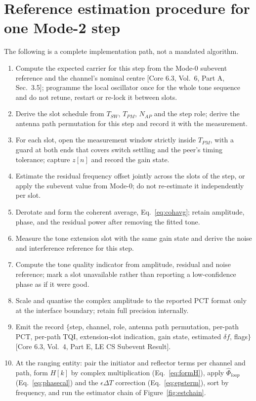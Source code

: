 \documentclass[11pt,a4paper]{article}
\newcommand{\PCT}{\mathrm{PCT}}
\newcommand{\TQI}{\mathrm{TQI}}
\newcommand{\Tsw}{T_{SW}}
\newcommand{\Tpm}{T_{PM}}
\newcommand{\Nap}{N_{AP}}
\newcommand{\core}[1]{\textcolor{rulegrey}{\small[Core 6.3, #1]}}
\begin{document}
\section{Reference estimation procedure for one Mode-2 step}

The following is a complete implementation path, not a mandated algorithm.

\begin{enumerate}[label=\textbf{P\arabic*.},leftmargin=2.6em,itemsep=2pt]
  \item Compute the expected carrier for this step from the Mode-0 subevent reference and the
    channel's nominal centre \core{Vol.\ 6, Part A, Sec.\ 3.5}; programme the local oscillator once
    for the whole tone sequence and do not retune, restart or re-lock it between slots.
  \item Derive the slot schedule from $\Tsw$, $\Tpm$, $\Nap$ and the step role; derive the antenna
    path permutation for this step and record it with the measurement.
  \item For each slot, open the measurement window strictly inside $\Tpm$, with a guard at both ends
    that covers switch settling and the peer's timing tolerance; capture $z[n]$ and record the gain
    state.
  \item Estimate the residual frequency offset jointly across the slots of the step, or apply the
    subevent value from Mode-0; do not re-estimate it independently per slot.
  \item Derotate and form the coherent average, Eq.~\eqref{eq:cohavg}; retain amplitude, phase, and
    the residual power after removing the fitted tone.
  \item Measure the tone extension slot with the same gain state and derive the noise and
    interference reference for this step.
  \item Compute the tone quality indicator from amplitude, residual and noise reference; mark a slot
    unavailable rather than reporting a low-confidence phase as if it were good.
  \item Scale and quantise the complex amplitude to the reported $\PCT$ format only at the interface
    boundary; retain full precision internally.
  \item Emit the record $\{$step, channel, role, antenna path permutation, per-path $\PCT$, per-path
    $\TQI$, extension-slot indication, gain state, estimated $\delta f$, flags$\}$
    \core{Vol.\ 4, Part E, LE CS Subevent Result}.
  \item At the ranging entity: pair the initiator and reflector terms per channel and path, form
    $H[k]$ by complex multiplication (Eq.~\eqref{eq:formH}), apply $\hat\Phi_{loop}$
    (Eq.~\eqref{eq:phasecal}) and the $\epsilon\Delta T$ correction (Eq.~\eqref{eq:epsterm}), sort by
    frequency, and run the estimator chain of Figure~\ref{fig:estchain}.
\end{enumerate}
\end{document}
